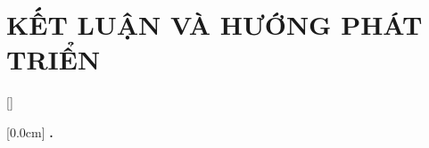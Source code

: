 \documentclass[a4paper,13pt,3p,twoside]{report}
\theoremstyle{definition}
\begin{document}
\chapter{KẾT LUẬN VÀ HƯỚNG PHÁT TRIỂN} %
\label{chapter:conclusion}


\newpage
% 


\newpage
\renewcommand\bibname{TÀI LIỆU THAM KHẢO}
{}
\nocite{*}



\appendixpage
\appendices
\addappheadtotoc


{}[]
\titlespacing*{\chapter}{0pt}{-20pt}{20pt}

    [0.0cm]             %
    {\bfseries\vspace{0.3cm}}                  %
    {{\bfseries{\scshape} \thecontentslabel.\ }} %
    {}         %
    {\contentspage}         %
% 
% 
\end{document}
